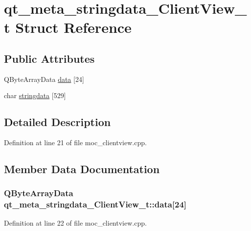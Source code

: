 \hypertarget{structqt__meta__stringdata___client_view__t}{}\section{qt\+\_\+meta\+\_\+stringdata\+\_\+\+Client\+View\+\_\+t Struct Reference}
\label{structqt__meta__stringdata___client_view__t}
\subsection*{Public Attributes}
\begin{DoxyCompactItemize}
\item 
Q\+Byte\+Array\+Data \hyperlink{structqt__meta__stringdata___client_view__t_a76e460132a7fcaf7b39b085b5e0cc691}{data} \mbox{[}24\mbox{]}
\item 
char \hyperlink{structqt__meta__stringdata___client_view__t_a0a268a2aad37e8237db18dbba34baf2a}{stringdata} \mbox{[}529\mbox{]}
\end{DoxyCompactItemize}


\subsection{Detailed Description}


Definition at line 21 of file moc\+\_\+clientview.\+cpp.



\subsection{Member Data Documentation}
\hypertarget{structqt__meta__stringdata___client_view__t_a76e460132a7fcaf7b39b085b5e0cc691}{}
\subsubsection[{data}]{\setlength{\rightskip}{0pt plus 5cm}Q\+Byte\+Array\+Data qt\+\_\+meta\+\_\+stringdata\+\_\+\+Client\+View\+\_\+t\+::data\mbox{[}24\mbox{]}}\label{structqt__meta__stringdata___client_view__t_a76e460132a7fcaf7b39b085b5e0cc691}


Definition at line 22 of file moc\+\_\+clientview.\+cpp.

